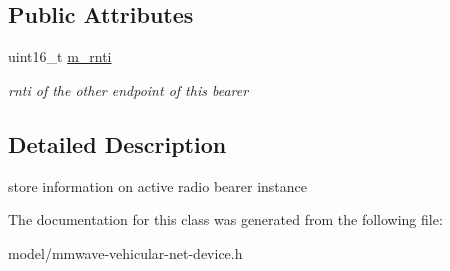 \subsection*{Public Attributes}
\begin{DoxyCompactItemize}
\item 
\mbox{\label{classns3_1_1millicar_1_1SidelinkRadioBearerInfo_abd89f4fdb332653516aec86da0d4e7c5}} 
uint16\+\_\+t \hyperlink{classns3_1_1millicar_1_1SidelinkRadioBearerInfo_abd89f4fdb332653516aec86da0d4e7c5}{m\+\_\+rnti}
\begin{DoxyCompactList}\small\item\em rnti of the other endpoint of this bearer \end{DoxyCompactList}\end{DoxyCompactItemize}


\subsection{Detailed Description}
store information on active radio bearer instance 

The documentation for this class was generated from the following file\+:\begin{DoxyCompactItemize}
\item 
model/mmwave-\/vehicular-\/net-\/device.\+h\end{DoxyCompactItemize}
